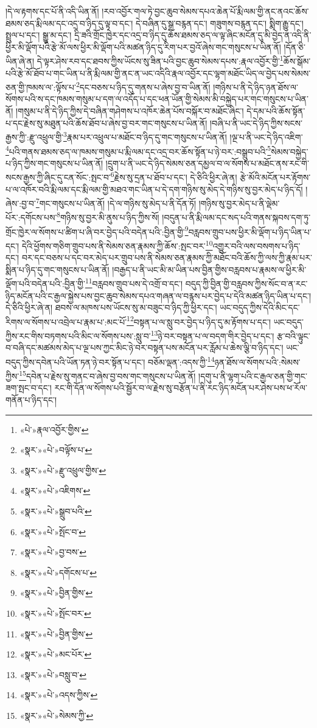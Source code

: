 །དེ་ལ་རྟགས་དང་པོ་ནི་འདི་ཡིན་ནོ། །རབ་འབྱོར་གལ་ཏེ་བྱང་ཆུབ་སེམས་དཔའ་ཆེན་པོ་རྨི་ལམ་གྱི་ནང་ནའང་ཆོས་ཐམས་ཅད་རྨི་ལམ་དང་འདྲ་བ་ཉིད་དུ་ལྟ་བ་དང་། དེ་བཞིན་དུ་སྒྲ་བརྙན་དང་། གཟུགས་བརྙན་དང་། སྨིག་རྒྱུ་དང་། སྤྲུལ་པ་དང་། སྒྱུ་མ་དང་། དྲི་ཟའི་གྲོང་ཁྱེར་དང་འདྲ་བ་ཉིད་དུ་ཆོས་ཐམས་ཅད་ལ་ལྟ་ཞིང་མངོན་དུ་མི་བྱེད་ན་འདི་ནི་ཕྱིར་མི་ལྡོག་པའི་རྩེ་མོ་ལས་ཕྱིར་མི་ལྡོག་པའི་མཚན་ཉིད་དུ་རིག་པར་བྱའོ་ཞེས་གང་གསུངས་པ་ཡིན་ནོ། །དོན་ཅི་ཡིན་ཞེ་ན། དེ་ལྟར་ཤེས་རབ་དང་ཐབས་ཀྱིས་ཡོངས་སུ་ཟིན་པའི་བྱང་ཆུབ་སེམས་དཔས་:རྣལ་འབྱོར་གྱི་\footnote{«པེ་»རྣལ་འབྱོར་གྱིས་}ཆོས་སྒོམ་པའི་རྩེ་མོ་ཐོབ་པ་གང་ཡིན་པ་ནི་རྨི་ལམ་གྱི་ནང་ན་ཡང་འདིའི་རྣལ་འབྱོར་དང་ལྷག་མཐོང་ཡིད་ལ་བྱེད་པས་སེམས་ཅན་གྱི་ཁམས་ལ་:ལྟོས་པ་\footnote{«སྣར་»«པེ་»བལྟོས་པ་}དང་བཅས་པ་ཉིད་དུ་གནས་པ་ཞེས་བྱ་བ་ཡིན་ནོ། །གཉིས་པ་ནི་དེ་ཉིད་ཉན་ཐོས་ལ་སོགས་པའི་ས་དང་ཁམས་གསུམ་པ་དག་ལ་འདོད་པ་དང་ཕན་ཡོན་གྱི་སེམས་མི་བསྐྱེད་པར་གང་གསུངས་པ་ཡིན་ནོ། །གསུམ་པ་ནི་དེ་ཉིད་ཀྱིས་དེ་བཞིན་གཤེགས་པ་འཁོར་ཆེན་པོས་བསྐོར་བ་མཐོང་ཞིང་། དེ་དམ་པའི་ཆོས་སྟོན་པ་དང་རྗེས་སུ་མཐུན་པའི་ཆོས་ཐོབ་པ་ཞེས་བྱ་བར་གང་གསུངས་པ་ཡིན་ནོ། །བཞི་པ་ནི་ཡང་དེ་ཉིད་ཀྱིས་སངས་རྒྱས་ཀྱི་:རྫུ་འཕྲུལ་གྱི་\footnote{«སྣར་»«པེ་»རྫུ་འཕྲུལ་གྱིས་}རྣམ་པར་འཕྲུལ་པ་མཐོང་བ་ཉིད་དུ་གང་གསུངས་པ་ཡིན་ནོ། །ལྔ་པ་ནི་ཡང་དེ་ཉིད་འཇིག་\footnote{«སྣར་»«པེ་»འཇིགས་}པའི་གནས་ཐམས་ཅད་ལ་ཁམས་གསུམ་པ་རྨི་ལམ་དང་འདྲ་བར་ཆོས་སྟོན་པ་ཉེ་བར་:བསྒྲུབ་པའི་\footnote{«སྣར་»«པེ་»སྒྲུབ་པའི་}སེམས་བསྐྱེད་པ་ཉིད་ཀྱིས་གང་གསུངས་པ་ཡིན་ནོ། །དྲུག་པ་ནི་ཡང་དེ་ཉིད་སེམས་ཅན་དམྱལ་བ་ལ་སོགས་པ་མཐོང་ནས་རང་གི་སངས་རྒྱས་ཀྱི་ཞིང་དུ་ངན་སོང་:སྤང་བ་\footnote{«སྣར་»«པེ་»སྤོང་བ་}རྗེས་སུ་དྲན་པ་ཐོབ་པ་དང་། དེ་ཅིའི་ཕྱིར་ཞེ་ན། རྩེ་མོའི་མངོན་པར་རྟོགས་པ་ལ་འཁོར་བའི་རྨི་ལམ་དང་རྨི་ལམ་གྱི་མཐའ་གང་ཡིན་པ་དེ་དག་གཉིས་སུ་མེད་དེ་གཉིས་སུ་བྱར་མེད་པ་ཉིད་དོ། །ཞེས་:བྱ་བ་\footnote{«སྣར་»«པེ་»བྱ་བས་}གང་གསུངས་པ་ཡིན་ནོ། །དེ་ལ་གཉིས་སུ་མེད་པ་ནི་དོན་ཏོ། །གཉིས་སུ་བྱར་མེད་པ་ནི་ལྡེམ་པོར་:དགོངས་པས་\footnote{«སྣར་»«པེ་»དགོངས་པ་}གཉིས་སུ་བྱར་མི་ནུས་པ་ཉིད་ཀྱིས་སོ། །བདུན་པ་ནི་རྨི་ལམ་དང་སད་པའི་གནས་སྐབས་དག་ཏུ་གྲོང་ཁྱེར་ལ་སོགས་པ་ཚིག་པ་ཞི་བར་བྱེད་པའི་བདེན་པའི་:བྱིན་གྱི་\footnote{«སྣར་»«པེ་»བྱིན་གྱིས་}བརླབས་གྲུབ་པས་ཕྱིར་མི་ལྡོག་པ་ཉིད་ཡིན་པ་དང་། དེའི་ཕྱོགས་གཅིག་གྲུབ་པས་ནི་སེམས་ཅན་རྣམས་ཀྱི་ཆོས་:སྤང་བར་\footnote{«སྣར་»«པེ་»སྤོང་བར་}འགྱུར་བའི་ལས་བསགས་པ་ཉིད་དང་། བར་དང་བཅས་པ་དང་བར་མེད་པར་གྲུབ་པས་ནི་སེམས་ཅན་རྣམས་ཀྱི་མཐོང་བའི་ཆོས་ཀྱི་ལས་ཀྱི་རྣམ་པར་སྨིན་པ་ཉིད་དུ་གང་གསུངས་པ་ཡིན་ནོ། །བརྒྱད་པ་ནི་ཡང་མི་མ་ཡིན་པས་བྱིན་གྱིས་བརླབས་པ་རྣམས་ལ་ཕྱིར་མི་ལྡོག་པའི་བདེན་པའི་:བྱིན་གྱི་\footnote{«སྣར་»«པེ་»བྱིན་གྱིས་}བརླབས་གྲུབ་པས་དེ་འགྲོ་བ་དང་། བདུད་ཀྱི་བྱིན་གྱི་བརླབས་ཀྱིས་སོང་བ་ན་རང་ཉིད་མངོན་པའི་ང་རྒྱལ་སྐྱེས་པས་བྱང་ཆུབ་སེམས་དཔའ་གཞན་ལ་བརྙས་པར་བྱེད་པ་དེའི་མཚན་ཉིད་ཡིན་པ་དང་། དེ་ཅིའི་ཕྱིར་ཞེ་ན། ཐབས་ལ་མཁས་པས་ཡོངས་སུ་མ་བཟུང་བ་ཉིད་ཀྱི་ཕྱིར་དང་། ཡང་བདུད་ཀྱིས་དེའི་མིང་དང་རིགས་ལ་སོགས་པ་འབྲེལ་པ་རྣམ་པ་:མང་པོ་\footnote{«སྣར་»«པེ་»མང་པོར་}བསྟན་པ་ལ་སླུ་བར་བྱེད་པ་ཉིད་དུ་མ་རྟོགས་པ་དང་། ཡང་བདུད་ཀྱིས་རང་གིས་བཏགས་པའི་མིང་ལ་སོགས་པས་:སླུ་བ་\footnote{«སྣར་»«པེ་»བསླུ་བ་}ཉེ་བར་བསྟན་པ་ལ་བདག་གིར་བྱེད་པ་དང་། རྩ་བའི་ལྟུང་བ་བཞི་དང་མཚམས་མེད་པ་ལྔ་པས་ཀྱང་མིང་ཉེ་བར་བསྟན་པས་མངོན་པར་རློམ་པ་ཆེས་ལྕི་བ་ཉིད་དང་། ཡང་བདུད་ཀྱིས་དབེན་པའི་ཡོན་ཏན་ཉེ་བར་སྟོན་པ་དང་། བཅོམ་ལྡན་:འདས་ཀྱི་\footnote{«སྣར་»«པེ་»འདས་ཀྱིས་}ཉན་ཐོས་ལ་སོགས་པའི་:སེམས་ཀྱིས་\footnote{«སྣར་»«པེ་»སེམས་ཀྱི་}དབེན་པ་རྗེས་སུ་གནང་བ་ཞེས་བྱ་བས་གང་གསུངས་པ་ཡིན་ནོ། །དགུ་པ་ནི་ལྷག་པའི་ང་རྒྱལ་ཅན་གྱི་གང་ཟག་སྤང་བ་དང་། རང་གི་དོན་ལ་སོགས་པའི་སྦྱོར་བ་ལ་རྗེས་སུ་བརྩོན་པ་ནི་རང་ཉིད་མངོན་པར་ཤེས་པས་ཕ་རོལ་གནོན་པ་ཉིད་དང་། 